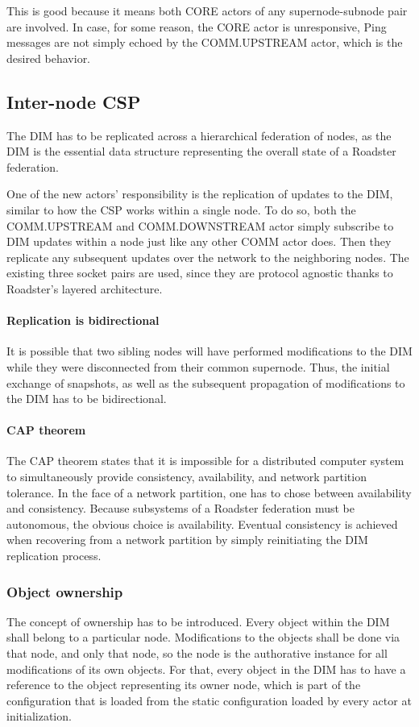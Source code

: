 This is good because it means both CORE actors of any supernode-subnode pair
are involved. In case, for some reason, the CORE actor is unresponsive, Ping
messages are not simply echoed by the COMM.UPSTREAM actor, which is the desired
behavior.


\subsection{Inter-node CSP}
The DIM has to be replicated across a hierarchical federation of nodes, as the
DIM is the essential data structure representing the overall state of a
Roadster federation.

One of the new actors' responsibility is the replication of updates to the DIM,
similar to how the \gls{CSP} works within a single node.  To do so, both the
COMM.UPSTREAM and COMM.DOWNSTREAM actor simply subscribe to DIM updates within
a node just like any other COMM actor does.  Then they replicate any subsequent
updates over the network to the neighboring nodes. The existing three socket
pairs are used, since they are protocol agnostic thanks to Roadster's layered
architecture.

\paragraph{Replication is bidirectional}
It is possible that two sibling nodes will have performed modifications to the
DIM while they were disconnected from their common supernode. Thus, the initial
exchange of snapshots, as well as the subsequent propagation of modifications
to the DIM has to be bidirectional.

\paragraph{CAP theorem}
The CAP theorem \cite{wp:cap} states that it is impossible for a distributed
computer system to simultaneously provide consistency, availability, and
network partition tolerance. In the face of a network partition, one has to
chose between availability and consistency. Because subsystems of a Roadster
federation must be autonomous, the obvious choice is availability. Eventual
consistency is achieved when recovering from a network partition by simply
reinitiating the DIM replication process.

\subsubsection{Object ownership}
The concept of ownership has to be introduced. Every object within the DIM
shall belong to a particular node. Modifications to the objects shall be done via
that node, and only that node, so the node is the authorative instance for all modifications of its own objects.
For that, every object in the DIM has to have a reference
to the object representing its owner node, which is part of
the configuration that is loaded from the static configuration loaded by every
actor at initialization.

